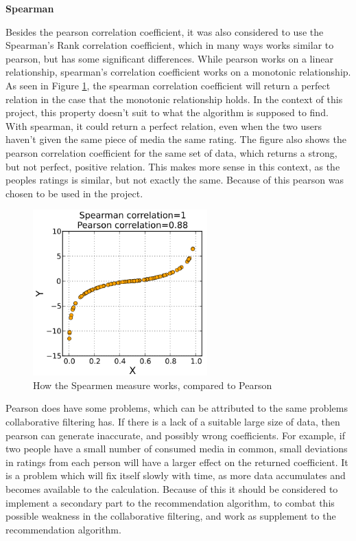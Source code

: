 \textbf{Spearman}

Besides the pearson correlation coefficient, it was also considered to use the Spearman’s Rank correlation coefficient, which in many ways works similar to pearson, but has some significant differences. While pearson works on a linear relationship, spearman’s correlation coefficient works on a monotonic relationship. As seen in Figure \ref{Spearman}, the spearman correlation coefficient will return a perfect relation in the case that the monotonic relationship holds. In the context of this project, this property doesn’t suit to what the algorithm is supposed to find. With spearman, it could return a perfect relation, even when the two users haven’t given the same piece of media the same rating. The figure also shows the pearson correlation coefficient for the same set of data, which returns a strong, but not perfect, positive relation. This makes more sense in this context, as the peoples ratings is similar, but not exactly the same. Because of this pearson was chosen to be used in the project.

\begin{figure}[htb]
\centering
\includegraphics[width=0.6\textwidth]{Images/spearman.png}
\caption{How the Spearmen measure works, compared to Pearson}
\label{Spearman}
\end{figure}

Pearson does have some problems, which can be attributed to the same problems collaborative filtering has. If there is a lack of a suitable large size of data, then pearson can generate inaccurate, and possibly wrong coefficients. For example, if two people have a small number of consumed media in common, small deviations in ratings from each person will have a larger effect on the returned coefficient. It is a problem which will fix itself slowly with time, as more data accumulates and becomes available to the calculation. Because of this it should be considered to implement a secondary part to the recommendation algorithm, to combat this possible weakness in the collaborative filtering, and work as supplement to the recommendation algorithm.